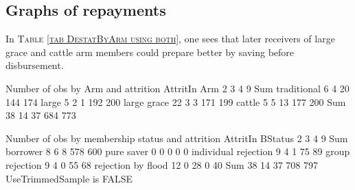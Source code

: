 

\subsection{Graphs of repayments}

In \textsc{\normalsize Table \ref{tab DestatByArm using both}}, one sees that later receivers of \textsf{large grace} and \textsf{cattle} arm members could prepare better by saving before disbursement. 
\begin{Schunk}
\begin{Soutput}


Number of obs by Arm and attrition
             AttritIn
Arm             2   3   4   9 Sum
  traditional   6   4  20 144 174
  large         5   2   1 192 200
  large grace  22   3   3 171 199
  cattle        5   5  13 177 200
  Sum          38  14  37 684 773


Number of obs by membership status and attrition
                      AttritIn
BStatus                  2   3   4   9 Sum
  borrower               8   6   8 578 600
  pure saver             0   0   0   0   0
  individual rejection   9   4   1  75  89
  group rejection        9   4   0  55  68
  rejection by flood    12   0  28   0  40
  Sum                   38  14  37 708 797
UseTrimmedSample is FALSE 
\end{Soutput}
\end{Schunk}

